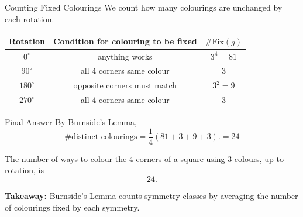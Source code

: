 \begin{frame}{Counting Fixed Colourings}
  We count how many colourings are unchanged by each rotation.

  \vspace{0.6em}

  \begin{center}
    \begin{tabular}{c|c|c}
      \textbf{Rotation} & \textbf{Condition for colouring to be fixed} & \(\#\mathrm{Fix}(g)\) \\ \hline
      \(0^\circ\) & anything works & \(3^4 = 81\) \\[0.3em]
      \(90^\circ\) & all 4 corners same colour & \(3\) \\[0.3em]
      \(180^\circ\) & opposite corners must match & \(3^2 = 9\) \\[0.3em]
      \(270^\circ\) & all 4 corners same colour & \(3\)
    \end{tabular}
  \end{center}

  \vspace{0.8em}

  \begin{center}
  \end{center}
\end{frame}

\begin{frame}{Final Answer}
  By Burnside's Lemma,
  \[
    \#\text{distinct colourings}
    =
    \frac{1}{4}
    \left(
      81 + 3 + 9 + 3
    \right).
    = 24
  \]


  \begin{sqt:definition}
    The number of ways to colour the 4 corners of a square using 3 colours,
    up to rotation, is
    \[
      \boxed{24}.
    \]
  \end{sqt:definition}

  \textbf{Takeaway:}
  Burnside’s Lemma counts symmetry classes by averaging the number of colourings
  fixed by each symmetry.
\end{frame}


